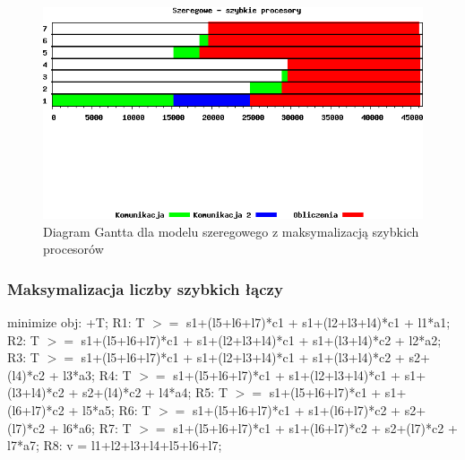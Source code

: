 \documentclass[a4paper,11pt, titlepage]{article}
\begin{document}
\begin{figure}[htp!]
\includegraphics[width=1.0\textwidth]{wykresy/szeregowe_proc}
\caption{Diagram Gantta dla modelu szeregowego z maksymalizacją szybkich procesorów \label{szeregowe_p}}
\end{figure}

\subsubsection{Maksymalizacja liczby szybkich łączy}
\begin{flushleft}

minimize obj: +T;\linebreak
\linebreak
R1: T $>=$ s1+(l5+l6+l7)*c1 + s1+(l2+l3+l4)*c1 + l1*a1;\linebreak
R2: T $>=$ s1+(l5+l6+l7)*c1 + s1+(l2+l3+l4)*c1 + s1+(l3+l4)*c2 + l2*a2;\linebreak
R3: T $>=$ s1+(l5+l6+l7)*c1 + s1+(l2+l3+l4)*c1 + s1+(l3+l4)*c2 + s2+(l4)*c2 + l3*a3;\linebreak
R4: T $>=$ s1+(l5+l6+l7)*c1 + s1+(l2+l3+l4)*c1 + s1+(l3+l4)*c2 + s2+(l4)*c2 + l4*a4;\linebreak
R5: T $>=$ s1+(l5+l6+l7)*c1 + s1+(l6+l7)*c2 + l5*a5;\linebreak
R6: T $>=$ s1+(l5+l6+l7)*c1 + s1+(l6+l7)*c2 + s2+(l7)*c2 + l6*a6;\linebreak
R7: T $>=$ s1+(l5+l6+l7)*c1 + s1+(l6+l7)*c2 + s2+(l7)*c2 + l7*a7;\linebreak
R8: v = l1+l2+l3+l4+l5+l6+l7;\linebreak
\end{flushleft}
\end{document}
